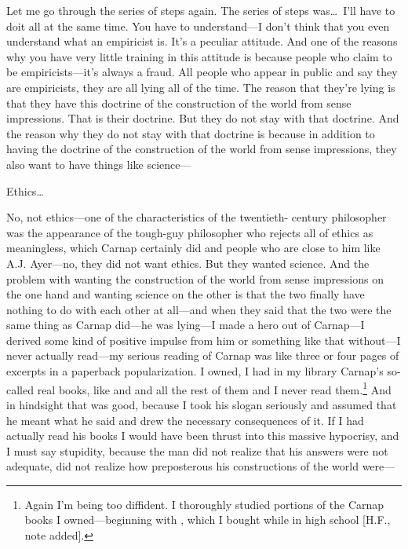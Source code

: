  Let me go through the series of steps again. The series of steps 
was\ldots\  I'll have to doit all at the same time. You have to understand---I 
don't think that you even understand what an empiricist is. It's a 
peculiar attitude. And one of the reasons why you have very little 
training in this attitude is because people who claim to be 
empiricists---it's always a fraud. All people who appear in public and say they are 
empiricists, they are all lying all of the time. The reason that they're 
lying is that they have this doctrine of the construction of the world 
from sense impressions. That is their doctrine. But they do not stay with 
that doctrine. And the reason why they do not stay with that doctrine is 
because in addition to having the doctrine of the construction of the 
world from sense impressions, they also want to have things like 
science--- 

 Ethics\ldots

 No, not ethics---one of the characteristics of the twentieth- 
century philosopher was the appearance of the tough-guy philosopher 
who rejects all of ethics as meaningless, which Carnap certainly did and 
people who are close to him like A.J. Ayer---no, they did not want 
ethics. But they wanted science. And the problem with wanting the 
construction of the world from sense impressions on the one hand and 
wanting science on the other is that the two finally have nothing to do 
with each other at all---and when they said that the two were the same 
thing as Carnap did---he was lying---I made a hero out of Carnap---I
derived some kind of positive impulse from him or something like that 
without---I never actually read---my serious reading of Carnap was like 
three or four pages of excerpts in a paperback popularization. I owned, 
I had in my library Carnap's so-called real books, like 
 and  and all the rest of them 
and I never read them.\footnote{Again I'm being too diffident. I thoroughly studied portions of the 
Carnap books I owned---beginning with ,
which I bought while in high school [H.F., note added].}
And in hindsight that was good, because I took 
his slogan seriously and assumed that he meant what he said and drew 
the necessary consequences of it. If I had actually read his books I 
would have been thrust into this massive hypocrisy, and I must say 
stupidity, because the man did not realize that his answers were not 
adequate, did not realize how preposterous his constructions of the 
world were--- 

